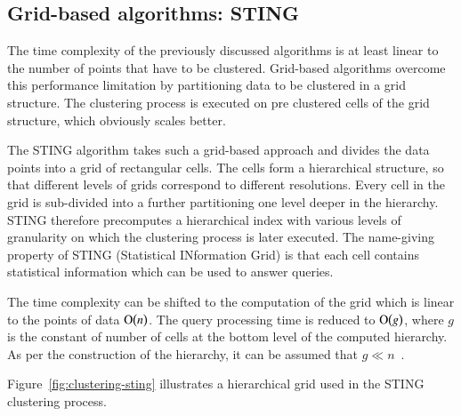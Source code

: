 \subsection{Grid-based algorithms: STING}
\label{chapter:clustering-grid}

The time complexity of the previously discussed algorithms is at least linear to the number of points that have to be clustered. Grid-based algorithms overcome this performance limitation by partitioning data to be clustered in a grid structure. The clustering process is executed on pre clustered cells of the grid structure, which obviously scales better.

The STING algorithm takes such a grid-based approach and divides the data points into a grid of rectangular cells. The cells form a hierarchical structure, so that different levels of grids correspond to different resolutions. Every cell in the grid is sub-divided into a further partitioning one level deeper in the hierarchy. STING therefore precomputes a hierarchical index with various levels of granularity on which the clustering process is later executed. The name-giving property of STING (Statistical INformation Grid) is that each cell contains statistical information which can be used to answer queries. 

The time complexity can be shifted to the computation of the grid which is linear to the points of data $\operatorname{O}\bigl(n\bigr)$. The query processing time is reduced to $\operatorname{O}\bigl(g\bigr)$, where $g$ is the constant of number of cells at the bottom level of the computed hierarchy. As per the construction of the hierarchy, it can be assumed that $g \ll n$~\cite{Varlaro08spatial, Wang97sting}.  

Figure~\ref{fig:clustering-sting} illustrates a hierarchical grid used in the STING clustering process.

